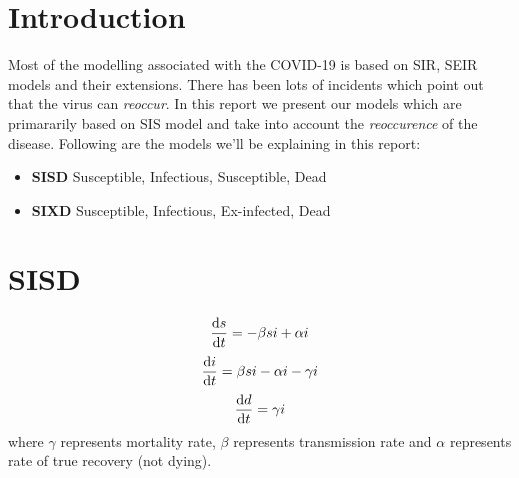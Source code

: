 \documentclass{article}
\begin{document}
	\section{Introduction}
	Most of the modelling associated with the COVID-19 is based on SIR, SEIR models and their extensions. There has been lots of incidents which point out that the virus can \textit{reoccur}. In this report we present our models which are primararily based on SIS model and take into account the \textit{reoccurence} of the disease. Following are the models we'll be explaining in this report: 
	\begin{itemize}
		\item \textbf{SISD} Susceptible, Infectious, Susceptible, Dead
		\item \textbf{SIXD} Susceptible, Infectious, Ex-infected, Dead
	\end{itemize}
	
	\section{SISD}
	\begin{equation*}
		\dv{s}{t} = -\beta si + \alpha i
	\end{equation*}
	\begin{equation*}
		\dv{i}{t} = \beta si - \alpha i - \gamma i
	\end{equation*}
	\begin{equation*}
		\dv{d}{t} = \gamma i
	\end{equation*}
	where $\gamma$ represents mortality rate, $\beta$ represents transmission rate and $\alpha$ represents rate of true recovery (not dying).
\end{document}
